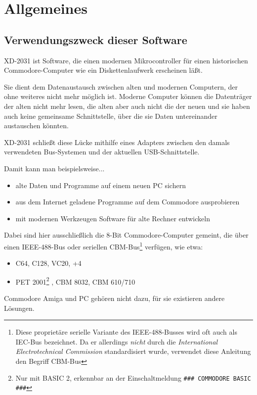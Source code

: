 \documentclass[10pt,a4paper]{scrartcl}		%
\begin{document}
\tableofcontents
\clearpage

\section{Allgemeines}

\subsection{Verwendungszweck dieser Software}
XD-2031 ist Software, die einen modernen Mikrocontroller für einen
historischen Commodore-Computer wie ein Diskettenlaufwerk erscheinen läßt.

Sie dient dem Datenaustausch zwischen alten und modernen Computern, der
ohne weiteres nicht mehr möglich ist. 
Moderne Computer können die Datenträger der alten nicht mehr lesen,
die alten aber auch nicht die der neuen und sie haben auch keine gemeinsame 
Schnittstelle, über die sie Daten untereinander austauschen könnten.

XD-2031 schließt diese Lücke mithilfe eines Adapters zwischen den
damals verwendeten Bus-Systemen und der aktuellen USB-Schnittstelle.

Damit kann man beispielsweise...
\begin{itemize}
\item alte Daten und Programme auf einem neuen PC sichern
\item aus dem Internet geladene Programme auf dem Commodore ausprobieren
\item mit modernen Werkzeugen Software für alte Rechner entwickeln
\end{itemize}

Dabei sind hier ausschließlich die 8-Bit Commodore-Computer gemeint, die über
einen IEEE-488-Bus  oder seriellen
	 CBM-Bus\footnote
	{Diese proprietäre serielle Variante des IEEE-488-Busses wird
	oft auch als IEC-Bus  bezeichnet.
	Da er allerdings \textit{nicht} durch die
	\textit{International Electrotechnical Commission} standardisiert
	wurde, verwendet diese Anleitung den Begriff CBM-Bus}
verfügen, wie etwa:
\begin{itemize}
\item C64, C128, VC20, +4
\item PET 2001\footnote{
	Nur mit BASIC 2, erkennbar an der Einschaltmeldung 
	\texttt{\#\#\# COMMODORE BASIC \#\#\#}}
, CBM 8032, CBM 610/710
\end{itemize}
Commodore Amiga und PC gehören nicht dazu, für sie existieren andere Lösungen.
\end{document}
